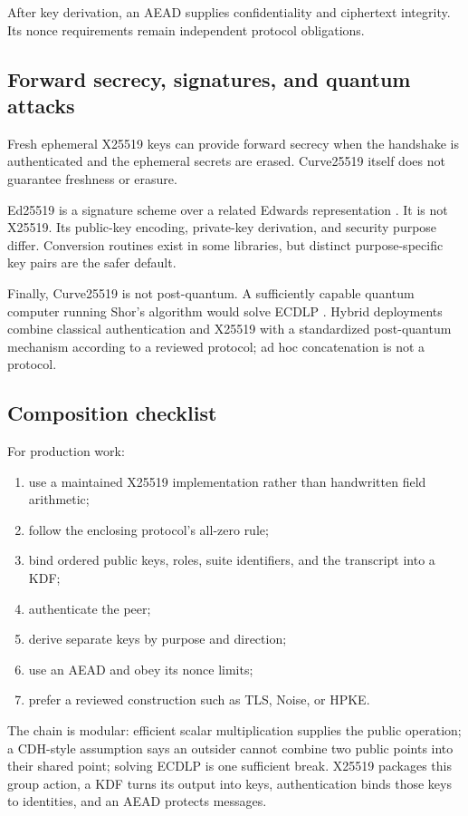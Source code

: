 After key derivation, an AEAD supplies confidentiality and ciphertext
integrity. Its nonce requirements remain independent protocol obligations.

\subsection{Forward secrecy, signatures, and quantum attacks}

Fresh ephemeral X25519 keys can provide forward secrecy when the handshake is
authenticated and the ephemeral secrets are erased. Curve25519 itself does not
guarantee freshness or erasure.

Ed25519 is a signature scheme over a related Edwards representation
\cite{rfc8032}. It is not X25519. Its public-key encoding, private-key
derivation, and security purpose differ. Conversion routines exist in some
libraries, but distinct purpose-specific key pairs are the safer default.

Finally, Curve25519 is not post-quantum. A sufficiently capable quantum
computer running Shor's algorithm would solve ECDLP \cite{shor1997}. Hybrid
deployments combine classical authentication and X25519 with a standardized
post-quantum mechanism according to a reviewed protocol; ad hoc concatenation
is not a protocol.

\subsection{Composition checklist}

For production work:
\begin{enumerate}
  \item use a maintained X25519 implementation rather than handwritten field
        arithmetic;
  \item follow the enclosing protocol's all-zero rule;
  \item bind ordered public keys, roles, suite identifiers, and the transcript
        into a KDF;
  \item authenticate the peer;
  \item derive separate keys by purpose and direction;
  \item use an AEAD and obey its nonce limits;
  \item prefer a reviewed construction such as TLS, Noise, or HPKE.
\end{enumerate}

\begin{takeaway}
The chain is modular: efficient scalar multiplication supplies the public
operation; a CDH-style assumption says an outsider cannot combine two public
points into their shared point; solving ECDLP is one sufficient break. X25519
packages this group action, a KDF turns its output into keys, authentication
binds those keys to identities, and an AEAD protects messages.
\end{takeaway}

